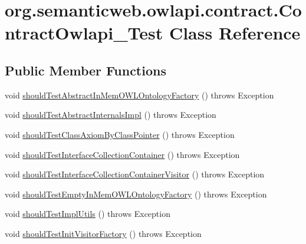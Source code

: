 \hypertarget{classorg_1_1semanticweb_1_1owlapi_1_1contract_1_1_contract_owlapi__1_test}{\section{org.\-semanticweb.\-owlapi.\-contract.\-Contract\-Owlapi\-\_\-Test Class Reference}
\label{classorg_1_1semanticweb_1_1owlapi_1_1contract_1_1_contract_owlapi__1_test}
}
\subsection*{Public Member Functions}
\begin{DoxyCompactItemize}
\item 
void \hyperlink{classorg_1_1semanticweb_1_1owlapi_1_1contract_1_1_contract_owlapi__1_test_a9d3a2eb83242336b8ecf14b6a4911b3c}{should\-Test\-Abstract\-In\-Mem\-O\-W\-L\-Ontology\-Factory} ()  throws Exception 
\item 
void \hyperlink{classorg_1_1semanticweb_1_1owlapi_1_1contract_1_1_contract_owlapi__1_test_aa5ae1d74773f143dd7be93560cdd4b1f}{should\-Test\-Abstract\-Internals\-Impl} ()  throws Exception 
\item 
void \hyperlink{classorg_1_1semanticweb_1_1owlapi_1_1contract_1_1_contract_owlapi__1_test_a68d0d19f6b0006acdba2f61b9c5e011d}{should\-Test\-Class\-Axiom\-By\-Class\-Pointer} ()  throws Exception 
\item 
void \hyperlink{classorg_1_1semanticweb_1_1owlapi_1_1contract_1_1_contract_owlapi__1_test_a3b4210ebd0865f50e82524d097590b09}{should\-Test\-Interface\-Collection\-Container} ()  throws Exception 
\item 
void \hyperlink{classorg_1_1semanticweb_1_1owlapi_1_1contract_1_1_contract_owlapi__1_test_a7f8946b2f3d9266c8e15600208d09c61}{should\-Test\-Interface\-Collection\-Container\-Visitor} ()  throws Exception 
\item 
void \hyperlink{classorg_1_1semanticweb_1_1owlapi_1_1contract_1_1_contract_owlapi__1_test_a303c3eff2938df340da5458dde4d5cd8}{should\-Test\-Empty\-In\-Mem\-O\-W\-L\-Ontology\-Factory} ()  throws Exception 
\item 
void \hyperlink{classorg_1_1semanticweb_1_1owlapi_1_1contract_1_1_contract_owlapi__1_test_ac97b16df3cddf87afdb0ec6317512bd5}{should\-Test\-Impl\-Utils} ()  throws Exception 
\item 
void \hyperlink{classorg_1_1semanticweb_1_1owlapi_1_1contract_1_1_contract_owlapi__1_test_a99709af6c5ba9b04fe721f238eddf3b9}{should\-Test\-Init\-Visitor\-Factory} ()  throws Exception 

\end{DoxyCompactItemize}
